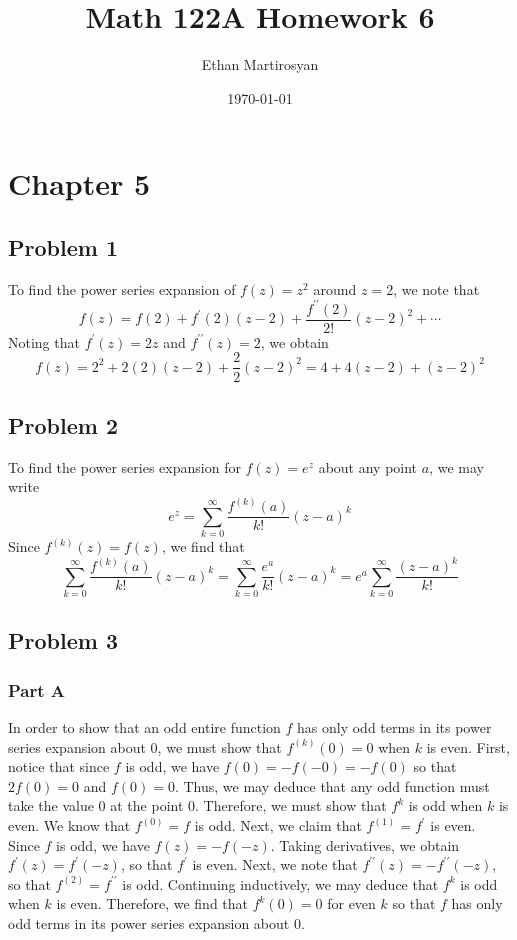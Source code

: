 \documentclass[12pt]{article}
\begin{document}
 
\title{Math 122A Homework 6}
\author{Ethan Martirosyan}
\date{\today}
\maketitle
{}
\hfuzz=50pt
\section*{Chapter 5}
\subsection*{Problem 1}
To find the power series expansion of $f(z) = z^2$ around $z = 2$, we note that
\[
f(z) = f(2) + f^\prime(2)(z-2) + \frac{f^{\prime\prime}(2)}{2!}(z-2)^2 + \cdots 
\] Noting that $f^\prime(z) = 2z$ and $f^{\prime\prime}(z) = 2$, we obtain
\[
f(z) = 2^2 + 2(2)(z-2) + \frac{2}{2}(z-2)^2 = 4 + 4(z-2) + (z-2)^2
\]
\newpage
\subsection*{Problem 2}
To find the power series expansion for $f(z) = e^z$ about any point $a$, we may write
\[
e^z = \sum_{k=0}^\infty \frac{f^{(k)}(a)}{k!}(z-a)^k
\] Since $f^{(k)}(z) = f(z)$, we find that
\[
\sum_{k=0}^\infty \frac{f^{(k)}(a)}{k!}(z-a)^k = \sum_{k=0}^\infty \frac{e^a}{k!}(z-a)^k = e^a \sum_{k=0}^\infty \frac{(z-a)^k}{k!}
\]
\newpage
\subsection*{Problem 3}
\subsubsection*{Part A}
In order to show that an odd entire function $f$ has only odd terms in its power series expansion about $0$, we must show that $f^{(k)}(0) = 0$ when $k$ is even. First, notice that since $f$ is odd, we have $f(0) = -f(-0) = -f(0)$ so that $2f(0) = 0$ and $f(0) = 0$. Thus, we may deduce that any odd function must take the value $0$ at the point $0$. Therefore, we must show that $f^{k}$ is odd when $k$ is even. We know that $f^{(0)} = f$ is odd. Next, we claim that $f^{(1)} = f^\prime$ is even. Since $f$ is odd, we have $f(z) = -f(-z)$. Taking derivatives, we obtain $f^\prime(z) = f^\prime(-z)$, so that $f^\prime$ is even. Next, we note that $f^{\prime\prime}(z) = -f^{\prime\prime}(-z)$, so that $f^{(2)} = f^{\prime\prime}$ is odd. Continuing inductively, we may deduce that $f^k$ is odd when $k$ is even. Therefore, we find that $f^{k}(0)=0$ for even $k$ so that $f$ has only odd terms in its power series expansion about $0$.
\end{document}
